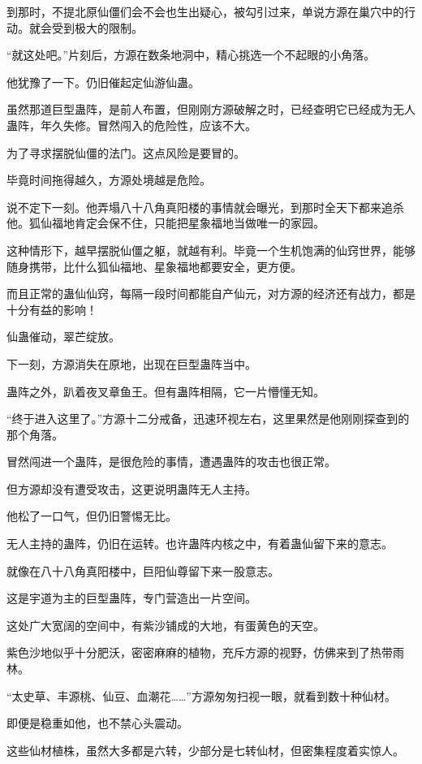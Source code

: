 \begin{this_body}
到那时，不提北原仙僵们会不会也生出疑心，被勾引过来，单说方源在巢穴中的行动。就会受到极大的限制。

“就这处吧。”片刻后，方源在数条地洞中，精心挑选一个不起眼的小角落。

他犹豫了一下。仍旧催起定仙游仙蛊。

虽然那道巨型蛊阵，是前人布置，但刚刚方源破解之时，已经查明它已经成为无人蛊阵，年久失修。冒然闯入的危险性，应该不大。

为了寻求摆脱仙僵的法门。这点风险是要冒的。

毕竟时间拖得越久，方源处境越是危险。

说不定下一刻。他弄塌八十八角真阳楼的事情就会曝光，到那时全天下都来追杀他。狐仙福地肯定会保不住，只能把星象福地当做唯一的家园。

这种情形下，越早摆脱仙僵之躯，就越有利。毕竟一个生机饱满的仙窍世界，能够随身携带，比什么狐仙福地、星象福地都要安全，更方便。

而且正常的蛊仙仙窍，每隔一段时间都能自产仙元，对方源的经济还有战力，都是十分有益的影响！

仙蛊催动，翠芒绽放。

下一刻，方源消失在原地，出现在巨型蛊阵当中。

蛊阵之外，趴着夜叉章鱼王。但有蛊阵相隔，它一片懵懂无知。

“终于进入这里了。”方源十二分戒备，迅速环视左右，这里果然是他刚刚探查到的那个角落。

冒然闯进一个蛊阵，是很危险的事情，遭遇蛊阵的攻击也很正常。

但方源却没有遭受攻击，这更说明蛊阵无人主持。

他松了一口气，但仍旧警惕无比。

无人主持的蛊阵，仍旧在运转。也许蛊阵内核之中，有着蛊仙留下来的意志。

就像在八十八角真阳楼中，巨阳仙尊留下来一股意志。

这是宇道为主的巨型蛊阵，专门营造出一片空间。

这处广大宽阔的空间中，有紫沙铺成的大地，有蛋黄色的天空。

紫色沙地似乎十分肥沃，密密麻麻的植物，充斥方源的视野，仿佛来到了热带雨林。

“太史草、丰源桃、仙豆、血潮花……”方源匆匆扫视一眼，就看到数十种仙材。

即便是稳重如他，也不禁心头震动。

这些仙材植株，虽然大多都是六转，少部分是七转仙材，但密集程度着实惊人。


\end{this_body}
